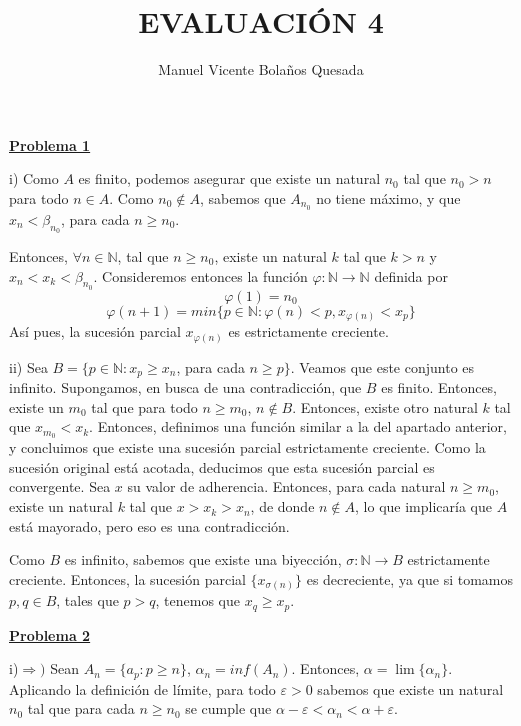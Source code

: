 \documentclass[10pt,a4paper]{article}
\begin{document}
	\title{EVALUACIÓN 4}
	\author{Manuel Vicente Bolaños Quesada}
	\date{}
	\maketitle
	
	
	\begin{flushleft}
		\textbf{\underline{Problema 1}}
	\end{flushleft}
	
	i) Como $A$ es finito, podemos asegurar que existe un natural $n_0$ tal que $n_0 > n$ para todo $n \in A$. Como $n_0 \notin A$, sabemos que $A_{n_0}$ no tiene máximo, y que $x_n < \beta_{n_0}$, para cada $n \geq n_0$.
	
	Entonces, $\forall n \in \mathbb{N}$, tal que $n \geq n_0$, existe un natural $k$ tal que $k > n$ y $x_n < x_k < \beta_{n_0}$. Consideremos entonces la función $\varphi : \mathbb{N} \rightarrow \mathbb{N}$ definida por $$ \varphi(1) = n_0$$ $$ \varphi(n+1) = min\{p \in \mathbb{N} : \varphi(n) < p, x_{\varphi(n)} < x_p\}$$
	Así pues, la sucesión parcial $x_{\varphi(n)}$ es estrictamente creciente.
	
	ii) Sea $B = \{p \in \mathbb{N}: x_p \geq x_n$, para cada $n \geq p\}$. Veamos que este conjunto es infinito. Supongamos, en busca de una contradicción, que $B$ es finito. Entonces, existe un $m_0$ tal que para todo $n \geq m_0$, $n \notin B$. Entonces, existe otro natural $k$ tal que $ x_{m_0} < x_k$. Entonces, definimos una función similar a la del apartado anterior, y concluimos que existe una sucesión parcial estrictamente creciente. Como la sucesión original está acotada, deducimos que esta sucesión parcial es convergente. Sea $x$ su valor de adherencia. Entonces, para cada natural $n \geq m_0$, existe un natural $k$ tal que $x > x_k > x_n$, de donde $ n \notin A$, lo que implicaría que $A$ está mayorado, pero eso es una contradicción.
	
	Como $B$ es infinito, sabemos que existe una biyección, $\sigma: \mathbb{N} \rightarrow B$ estrictamente creciente. Entonces, la sucesión parcial $\{x_{\sigma(n)}\}$ es decreciente, ya que si tomamos $p, q \in B$, tales que $p > q$, tenemos que $x_q \geq x_p$.
	
	 
	

	
	\begin{flushleft}
		\textbf{\underline{Problema 2}}
	\end{flushleft}	
	
	i)$\Rightarrow )$ Sean $A_n = \{ a_p : p \geq n\}$, $\alpha_n = inf(A_n)$. Entonces, $\alpha = \lim\{\alpha_n\}$. Aplicando la definición de límite, para todo $\varepsilon > 0$ sabemos que existe un natural $n_0$ tal que para cada $n \geq n_0$ se cumple que $\alpha - \varepsilon < \alpha_n < \alpha + \varepsilon$. 
	
\end{document}
